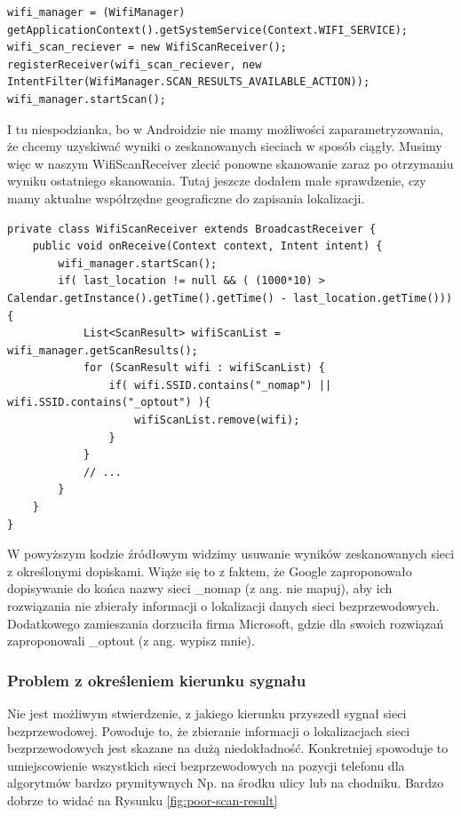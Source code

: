 \begin{verbatim}
wifi_manager = (WifiManager) getApplicationContext().getSystemService(Context.WIFI_SERVICE);
wifi_scan_reciever = new WifiScanReceiver();
registerReceiver(wifi_scan_reciever, new IntentFilter(WifiManager.SCAN_RESULTS_AVAILABLE_ACTION));
wifi_manager.startScan();
\end{verbatim}

I tu niespodzianka, bo w Androidzie nie mamy możliwości zaparametryzowania, że chcemy uzyskiwać wyniki o zeskanowanych sieciach w sposób ciągły. Musimy więc w naszym WifiScanReceiver zlecić ponowne skanowanie zaraz po otrzymaniu wyniku ostatniego skanowania. Tutaj jeszcze dodałem małe sprawdzenie, czy mamy aktualne współrzędne geograficzne do zapisania lokalizacji.

\begin{verbatim}
private class WifiScanReceiver extends BroadcastReceiver {
    public void onReceive(Context context, Intent intent) {
        wifi_manager.startScan();
        if( last_location != null && ( (1000*10) > Calendar.getInstance().getTime().getTime() - last_location.getTime())){
            List<ScanResult> wifiScanList = wifi_manager.getScanResults();
            for (ScanResult wifi : wifiScanList) {
                if( wifi.SSID.contains("_nomap") || wifi.SSID.contains("_optout") ){
                    wifiScanList.remove(wifi);
                }
            }
            // ...
        }
    }
}
\end{verbatim}
W powyższym kodzie źródłowym widzimy usuwanie wyników zeskanowanych sieci z określonymi dopiskami. Wiąże się to z faktem, że Google zaproponowało dopisywanie do końca nazwy sieci \_nomap (z ang. nie mapuj), aby ich rozwiązania nie zbierały informacji o lokalizacji danych sieci bezprzewodowych.\cite{GoogleNomap} Dodatkowego zamieszania dorzuciła firma Microsoft, gdzie dla swoich rozwiązań zaproponowali \_optout (z ang. wypisz mnie).\cite{MicrosoftOptout}

\subsubsection{Problem z określeniem kierunku sygnału}
Nie jest możliwym stwierdzenie, z jakiego kierunku przyszedł sygnał sieci bezprzewodowej. Powoduje to, że zbieranie informacji o lokalizacjach sieci bezprzewodowych jest skazane na dużą niedokładność. Konkretniej spowoduje to umiejscowienie wszystkich sieci bezprzewodowych na pozycji telefonu dla algorytmów bardzo prymitywnych Np. na środku ulicy lub na chodniku. Bardzo dobrze to widać na Rysunku \ref{fig:poor-scan-result}


